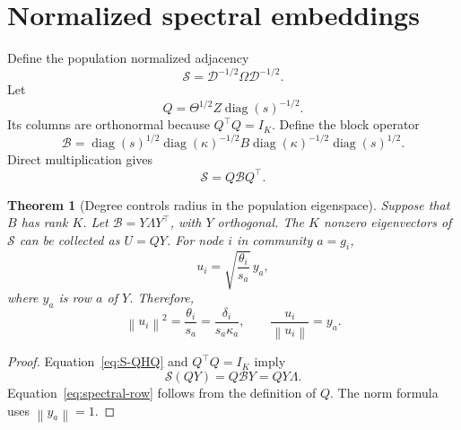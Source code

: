 \documentclass[aps,pre,reprint,superscriptaddress,longbibliography]{revtex4-2}
\newcommand{\norm}[1]{\left\lVert #1 \right\rVert}
\DeclareMathOperator{\diag}{diag}
\newtheorem{theorem}{Theorem}
\begin{document}
\section{Normalized spectral embeddings}
\label{sec:normalized-spectral}

Define the population normalized adjacency
\begin{equation}
    \mathcal{S}
    =
    \mathcal{D}^{-1/2}\Omega\mathcal{D}^{-1/2}.
    \label{eq:normalized-adjacency}
\end{equation}
Let
\begin{equation}
    Q=\Theta^{1/2}Z\diag(s)^{-1/2}.
    \label{eq:Q}
\end{equation}
Its columns are orthonormal because \(Q^\top Q=I_K\).
Define the block operator
\begin{equation}
    \mathcal{B}=
    \diag(s)^{1/2}
    \diag(\kappa)^{-1/2}
    B
    \diag(\kappa)^{-1/2}
    \diag(s)^{1/2}.
    \label{eq:block-operator}
\end{equation}
Direct multiplication gives
\begin{equation}
    \mathcal{S}=Q\mathcal{B}Q^\top.
    \label{eq:S-QHQ}
\end{equation}

\begin{theorem}[Degree controls radius in the population eigenspace]
\label{thm:spectral-rays}
Suppose that \(B\) has rank \(K\).
Let \(\mathcal{B}=Y\Lambda Y^\top\), with \(Y\) orthogonal.
The \(K\) nonzero eigenvectors of \(\mathcal{S}\) can be collected as \(U=QY\).
For node \(i\) in community \(a=g_i\),
\begin{equation}
    u_i=\sqrt{\frac{\theta_i}{s_a}}\,y_a,
    \label{eq:spectral-row}
\end{equation}
where \(y_a\) is row \(a\) of \(Y\).
Therefore,
\begin{equation}
    \norm{u_i}^2
    =
    \frac{\theta_i}{s_a}
    =
    \frac{\delta_i}{s_a\kappa_a},
    \qquad
    \frac{u_i}{\norm{u_i}}=y_a.
    \label{eq:spectral-norm-direction}
\end{equation}
\end{theorem}

\begin{proof}
Equation~\eqref{eq:S-QHQ} and \(Q^\top Q=I_K\) imply
\begin{equation}
    \mathcal{S}(QY)=Q\mathcal{B}Y=QY\Lambda.
\end{equation}
Equation~\eqref{eq:spectral-row} follows from the definition of \(Q\).
The norm formula uses \(\norm{y_a}=1\).
\end{proof}
\end{document}
